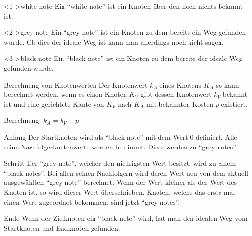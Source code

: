 \begin{frame}
	\begin{block}<1->{white note}
		Ein ``white note'' ist ein Knoten über den noch nichts bekannt ist.
	\end{block}
	\begin{block}<2->{grey note}
		Ein ``grey note'' ist ein Knoten zu dem bereits ein Weg gefunden wurde. Ob dies der ideale Weg ist kann man allerdings noch nicht sagen.
	\end{block}
	\begin{block}<3->{black note}
		Ein ``black note'' ist ein Knoten zu dem bereits der ideale Weg gefunden wurde.
	\end{block}
\end{frame}

\begin{frame}
	\begin{block}{Berechnung von Knotenwerten}
		Der Knotenwert $k_A$ eines Knotens $K_A$ so kann berechnet werden, wenn es einen Knoten $K_V$ gibt dessen Knotenwert $k_V$ bekannt ist und eine gerichtete Kante von $K_V$ nach $K_A$ mit bekannten Kosten $p$ existiert.
	\end{block}
	\vfill
	Berechnung: $k_A = k_V + p$
\end{frame}

\begin{frame}
	\begin{block}{Anfang}
		Der Startknoten wird als ``black note'' mit dem Wert 0 definiert. 
		Alle seine Nachfolgerknotenwerte werden bestimmt. Diese werden zu ``grey notes''
	\end{block}
\end{frame}
\begin{frame}
	\begin{block}{Schritt}
		Der ``grey note'', welcher den niedrigsten Wert besitzt, wird zu einem ``black notes''.
		Bei allen seinen Nachfolgern wird deren Wert neu von dem aktuell ausgewählten ``grey note'' berechnet. Wenn der Wert kleiner als der Wert des Knoten ist, so wird dieser Wert überschrieben.
		Knoten, welche das erste mal einen Wert zugeordnet bekommen, sind jetzt ``grey notes''.
	\end{block}
\end{frame}
\begin{frame}
	\begin{block}{Ende}
		Wenn der Zielknoten ein ``black note'' wird, hat man den idealen Weg vom Startknoten und Endknoten gefunden.
	\end{block}

\end{frame}